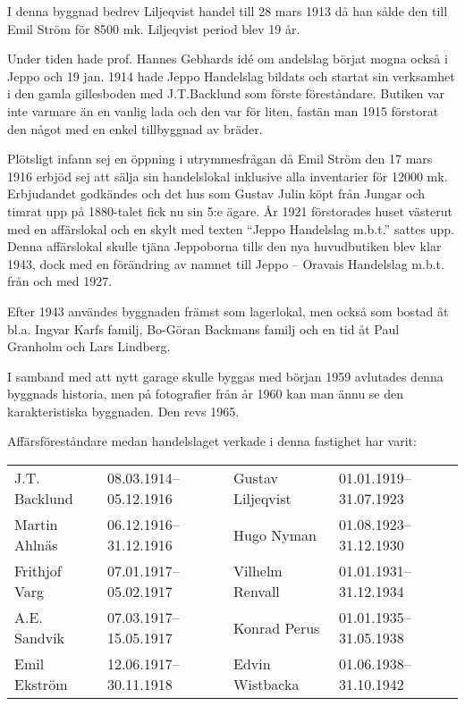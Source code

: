 I denna byggnad bedrev Liljeqvist handel till 28 mars 1913 då han sålde den till Emil Ström för 8500 mk. Liljeqvist period blev 19 år.

Under tiden hade prof. Hannes Gebhards idé om andelslag börjat mogna också i Jeppo och 19 jan. 1914 hade Jeppo Handelslag bildats och startat sin verksamhet i den gamla gillesboden med J.T.Backlund som förste föreståndare. Butiken var inte varmare än en vanlig lada och den var för liten, fastän man 1915 förstorat den något med en enkel tillbyggnad av bräder.

Plötsligt infann sej en öppning i utrymmesfrågan då Emil Ström den 17 mars 1916 erbjöd sej att sälja sin handelslokal inklusive alla inventarier för 12000 mk. Erbjudandet godkändes och det hus som Gustav Julin köpt från Jungar och timrat upp på 1880-talet fick nu sin 5:e ägare. År 1921 förstorades huset västerut med en affärslokal och en skylt med texten ``Jeppo Handelslag m.b.t.'' sattes upp. Denna affärslokal skulle tjäna Jeppoborna tills den nya huvudbutiken blev klar 1943, dock med en förändring av namnet till Jeppo – Oravais Handelslag m.b.t. från och med  1927.

Efter 1943 användes byggnaden främst som lagerlokal, men också som bostad åt bl.a. Ingvar Karfs familj, Bo-Göran Backmans familj och en tid åt Paul Granholm och Lars Lindberg.

I samband med att nytt garage skulle byggas med början 1959 avlutades denna byggnads historia, men på fotografier från år 1960 kan man ännu se den karakteristiska byggnaden. Den revs 1965.

Affärsföreståndare medan handelslaget verkade i denna fastighet har varit:
\begin{center}
  \begin{tabular}{l l l l}
    \hline
    J.T. Backlund & 08.03.1914--05.12.1916 & Gustav Liljeqvist & 01.01.1919--31.07.1923 \\
    Martin Ahlnäs & 06.12.1916--31.12.1916 & Hugo Nyman & 01.08.1923--31.12.1930 \\
    Frithjof Varg & 07.01.1917--05.02.1917 & Vilhelm Renvall & 01.01.1931--31.12.1934 \\
    A.E. Sandvik & 07.03.1917--15.05.1917 & Konrad Perus & 01.01.1935--31.05.1938 \\
    Emil Ekström & 12.06.1917--30.11.1918 & Edvin Wistbacka & 01.06.1938--31.10.1942 \\ \hline
  \end{tabular}
\end{center}

